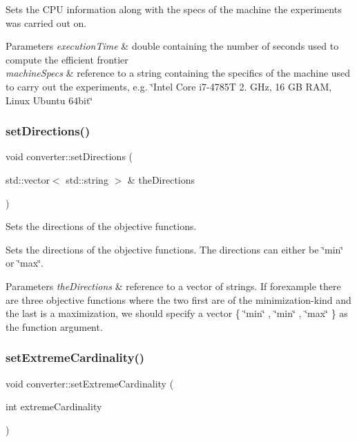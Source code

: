 Sets the C\+PU information along with the specs of the machine the experiments was carried out on. 
\begin{DoxyParams}{Parameters}
{\em execution\+Time} & double containing the number of seconds used to compute the efficient frontier \\
\hline
{\em machine\+Specs} & reference to a string containing the specifics of the machine used to carry out the experiments, e.\+g. \char`\"{}\+Intel Core i7-\/4785\+T 2. G\+Hz, 16 G\+B R\+A\+M, Linux Ubuntu 64bit\char`\"{} \\
\hline
\end{DoxyParams}
\mbox{\label{classconverter_aef8cb59efa0d7a9c34c83b5701658d8b}} 
\subsubsection{\texorpdfstring{set\+Directions()}{setDirections()}}
{\footnotesize\ttfamily void converter\+::set\+Directions (\begin{DoxyParamCaption}\item[{std\+::vector$<$ std\+::string $>$ \&}]{the\+Directions }\end{DoxyParamCaption})}



Sets the directions of the objective functions. 

Sets the directions of the objective functions. The directions can either be \char`\"{}min\char`\"{} or \char`\"{}max\char`\"{}. 
\begin{DoxyParams}{Parameters}
{\em the\+Directions} & reference to a vector of strings. If forexample there are three objective functions where the two first are of the minimization-\/kind and the last is a maximization, we should specify a vector \{ \char`\"{}min\char`\"{} , \char`\"{}min\char`\"{} , \char`\"{}max\char`\"{} \} as the function argument. \\
\hline
\end{DoxyParams}
\mbox{\label{classconverter_aac7ed61410e4f16aed940e845e23cea7}} 
\subsubsection{\texorpdfstring{set\+Extreme\+Cardinality()}{setExtremeCardinality()}}
{\footnotesize\ttfamily void converter\+::set\+Extreme\+Cardinality (\begin{DoxyParamCaption}\item[{int}]{extreme\+Cardinality }\end{DoxyParamCaption})\hspace{0.3cm}{\ttfamily [inline]}}

